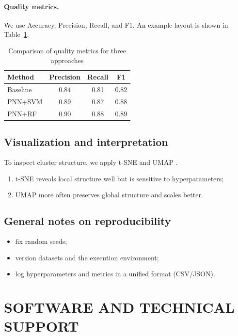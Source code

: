 \documentclass{article}
\begin{document}
\paragraph{Quality metrics.}
We use Accuracy, Precision, Recall, and F1. An example layout is shown in Table~\ref{tab:metrics}.
\begin{table}[htbp]
  \caption{Comparison of quality metrics for three approaches}
  \label{tab:metrics}
  \centering
  \begin{tabular}{|l|c|c|c|}
    \hline
    Method   & Precision & Recall & F1   \\
    \hline
    Baseline & 0.84      & 0.81   & 0.82 \\
    \hline
    PNN+SVM  & 0.89      & 0.87   & 0.88 \\
    \hline
    PNN+RF   & 0.90      & 0.88   & 0.89 \\
    \hline
  \end{tabular}
\end{table}

\subsection{Visualization and interpretation}
To inspect cluster structure, we apply t-SNE \cite{tsne2008} and UMAP \cite{umap2018}.
\begin{enumerate}
  \item t-SNE reveals local structure well but is sensitive to hyperparameters;
  \item UMAP more often preserves global structure and scales better.
\end{enumerate}

\subsection{General notes on reproducibility}
\begin{itemize}
  \item fix random seeds;
  \item version datasets and the execution environment;
  \item log hyperparameters and metrics in a unified format (CSV/JSON).
\end{itemize}

\section{SOFTWARE AND TECHNICAL SUPPORT}
\end{document}
